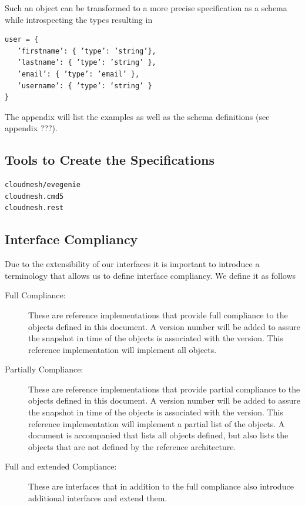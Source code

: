 \documentclass[9pt,twocolumn,twoside]{styles/osajnl}
\begin{document}
Such an object can be transformed to a more precise specification as a
schema while introspecting the types resulting in  

\begin{Verbatim}
user = {  
   ’firstname’: { ’type’: ’string’},  
   ’lastname’: { ’type’: ’string’ },   
   ’email’: { ’type’: ’email’ },  
   ’username’: { ’type’: ‘string’ } 
}  
\end{Verbatim}

The appendix will list the examples as well as the schema definitions
(see appendix ???).  

\subsection{Tools to Create the Specifications}

\begin{Verbatim}
cloudmesh/evegenie
cloudmesh.cmd5
cloudmesh.rest
\end{Verbatim}


\subsection{Interface Compliancy}

Due to the extensibility of our interfaces it is important to
introduce a terminology that allows us to define interface
compliancy. We define it as follows

\begin{description}

\item[Full Compliance:] These are reference implementations that
  provide full compliance to the objects defined in this document. A
  version number will be added to assure the snapshot in time of the
  objects is associated with the version. This reference
  implementation will implement all objects.

\item[Partially Compliance:] These are reference implementations that
  provide partial compliance to the objects defined in this
  document. A version number will be added to assure the snapshot in
  time of the objects is associated with the version. This reference
  implementation will implement a partial list of the objects. A
  document is accompanied that lists all objects defined, but also
  lists the objects that are not defined by the reference
  architecture.

\item[Full and extended Compliance:] These are interfaces that in
  addition to the full compliance also introduce additional interfaces
  and extend them.

\end{description}
\end{document}
